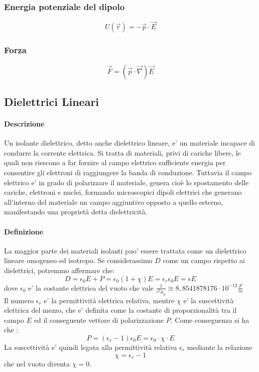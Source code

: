 \documentclass[a4paper, 10pt]{article}
\begin{document}
			\subsubsection{Energia potenziale del dipolo}
			\[U(\overrightarrow{r}) = -\overrightarrow{p} \cdot \overrightarrow{E} \]
			\subsubsection{Forza}
			\[ \overrightarrow{F} = (\overrightarrow{p} \cdot \overrightarrow{\nabla}) \overrightarrow{E} \]
		\subsection{Dielettrici Lineari}
			\paragraph*{Descrizione}
			Un isolante dielettrico, detto anche dielettrico lineare, e' un materiale incapace di condurre la corrente 
			elettrica. Si tratta di materiali, privi di cariche libere, le quali non riescono a far fornire al campo elettrico 
			sufficiente energia per consentire gli elettroni di raggiungere la banda di conduzione.  Tuttavia il campo elettrico
			e' in grado di polarizzare il materiale, genera cioè lo spostamento delle cariche, elettroni e nuclei, 
			formando microscopici dipoli elettrici che generano all'interno del materiale un campo aggiuntivo opposto a 
			quello esterno, manifestando una proprietà detta dielettricità.
			\paragraph*{Definizione}
			La maggior parte dei materiali isolanti puo' essere trattata come un dielettrico lineare omogeneo ed isotropo. 
			Se considerassimo $D$ come un campo rispetto ai dielettrici, potremmo affermare che: 
			\[ D = \epsilon_0 E + P = \epsilon_0 ( 1 + \chi)E = \epsilon_r \epsilon_0 E = \epsilon E \]
			dove $\epsilon_0$ e' la costante elettrica del vuoto che vale $\frac{1}{c^2 \mu_0} 
			\cong 8,8541878176 \cdot 10^{-12} \frac{F}{m} $ \\
			Il numero $\epsilon_r$ e' la permittività elettrica relativa, mentre $\chi$ e' la suscettività 
			elettrica del mezzo, che e' definita come la costante di proporzionalità tra il campo $E$ ed il 
			conseguente vettore di polarizzazione $P$. Come conseguenza si ha che :
			\[ P = (\epsilon_r - 1 ) \epsilon_0 E = \epsilon_0 \cdot \chi \cdot E \]
			La suscettività e' quindi legata alla permittività relativa $\epsilon_r$ mediante la relazione 
			\[ \chi = \epsilon_r -1 \] che nel vuoto diventa $\chi = 0$.
\end{document}
